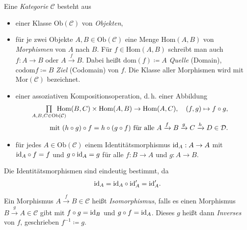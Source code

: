 \documentclass{cheat-sheet}
\newcommand{\Ob}{\mathrm{Ob}} %
\newcommand{\Hom}{\mathrm{Hom}} %
\newcommand{\Mor}{\mathrm{Mor}} %
\newcommand{\dom}{\mathrm{dom}} %
\newcommand{\codom}{\mathrm{codom}} %
\begin{document}
\begin{defn}
  Eine \emph{Kategorie} $\mathcal{C}$ besteht aus
  \begin{itemize}
    \item einer Klasse $\Ob(\mathcal{C})$ von \emph{Objekten},
    \item für je zwei Objekte $A, B \in \Ob(\mathcal{C})$ eine Menge $\Hom(A, B)$ von \emph{Morphismen} von $A$ nach $B$. Für $f \in \Hom(A, B)$ schreibt man auch $f : A \to B$ oder $A \xrightarrow{f} B$. Dabei heißt $\dom(f) \coloneqq A$ \emph{Quelle} (Domain), $\codom{f} \coloneqq B$ \emph{Ziel} (Codomain) von $f$. Die Klasse aller Morphismen wird mit $\Mor(\mathcal{C})$ bezeichnet.
    \item einer assoziativen Kompositionsoperation, d.\,h. einer Abbildung
    \begin{align*}
      \quad \prod_{\mathclap{A, B, C \in \Ob(\mathcal{C})}} \enspace \Hom(B, C) \times \Hom(A, B) \to \Hom(A, C), \quad
      (f, g) \mapsto f \circ g,\\
      \text{mit } (h \circ g) \circ f = h \circ (g \circ f)
      \text{ für alle } A \xrightarrow{f} B \xrightarrow{g} C \xrightarrow{h} D \in \mathcal{D}.
    \end{align*}
    \item für jedes $A \in \Ob(\mathcal{C})$ einem Identitätsmorphismus $\mathrm{id}_A : A \to A$ mit $\mathrm{id}_A \circ f = f$ und $g \circ \mathrm{id}_A = g$ für alle $f : B \to A$ und $g : A \to B$.
  \end{itemize}
\end{defn}

\begin{bem}
  Die Identitätsmorphismen sind eindeutig bestimmt, da
  \[ \mathrm{id}_A = \mathrm{id}_A \circ \mathrm{id}'_A = \mathrm{id}'_A. \]
\end{bem}

\begin{defn}
  Ein Morphismus $A \xrightarrow{f} B \in \mathcal{C}$ heißt \emph{Isomorphismus}, falls es einen Morphismus $B \xrightarrow{g} A \in \mathcal{C}$ gibt mit $f \circ g = \mathrm{id}_B$ und $g \circ f = \mathrm{id}_A$. Dieses $g$ heißt dann \emph{Inverses} von $f$, geschrieben $f^{-1} \coloneqq g$.
\end{defn}
\end{document}
